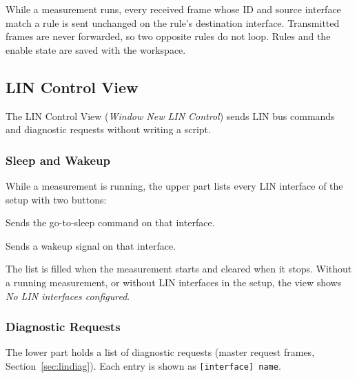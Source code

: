 \documentclass[a4paper,11pt]{article}
\newcommand{\menu}[1]{\textit{#1}}
\begin{document}
While a measurement runs, every received frame whose ID and source interface match
a rule is sent unchanged on the rule's destination interface. Transmitted frames
are never forwarded, so two opposite rules do not loop. Rules and the enable state
are saved with the workspace.

\subsection{LIN Control View}
\label{sec:lincontrol}

The LIN Control View (\menu{Window \textrightarrow{} New \textrightarrow{} LIN Control})
sends LIN bus commands and diagnostic requests without writing a script.

\subsubsection{Sleep and Wakeup}

While a measurement is running, the upper part lists every LIN interface of the
setup with two buttons:

\begin{description}[leftmargin=2em, style=nextline]
  \item[Sleep] Sends the go-to-sleep command on that interface.
  \item[Wakeup] Sends a wakeup signal on that interface.
\end{description}

The list is filled when the measurement starts and cleared when it stops. Without a
running measurement, or without LIN interfaces in the setup, the view shows
\textit{No LIN interfaces configured}.

\subsubsection{Diagnostic Requests}

The lower part holds a list of diagnostic requests (master request frames,
Section~\ref{sec:lindiag}). Each entry is shown as \texttt{[interface]~name}.
\end{document}
